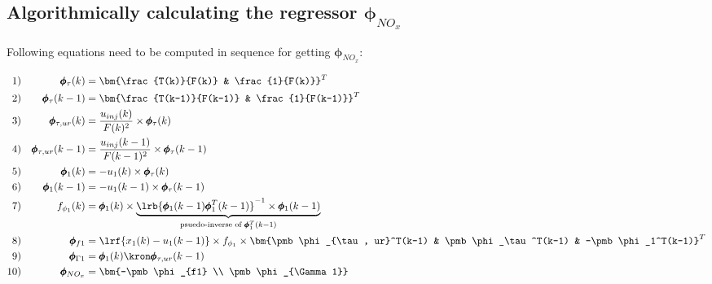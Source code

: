 \subsection{Algorithmically calculating the regressor $\pmb \phi_{NO_x}$}

Following equations need to be computed in sequence for getting $\pmb \phi_{NO_x}$:


\begin{align*}
        1)&& \pmb \phi_\tau(k) &= \bm{\frac{T(k)}{F(k)} & \frac{1}{F(k)}}^T \\
        2)&& \pmb \phi_\tau(k-1)&= \bm{\frac{T(k-1)}{F(k-1)} & \frac{1}{F(k-1)}}^T \\
        3)&& \pmb \phi_{\tau, ur}(k)&= \frac{u_{inj}(k)}{F(k)^2} \times \pmb \phi_\tau(k) \\
        4)&& \pmb \phi_{\tau, ur}(k-1)&= \frac{u_{inj}(k-1)}{F(k-1)^2} \times \pmb \phi_\tau(k-1) \\
        5)&& \pmb \phi_1(k) &= -u_1(k) \times \pmb \phi_\tau(k)\\
        6)&& \pmb \phi_1(k-1) &= -u_1(k-1) \times \pmb \phi_\tau(k-1) \\
        7)&& f_{\phi_1}(k) &= \pmb \phi_1(k) \times \underbrace{\lrb{\pmb \phi_1(k-1) \pmb \phi_1^T(k-1)}^{-1} \times \pmb \phi_1(k-1)}_{\text{psuedo-inverse of } \pmb \phi_1^T(k-1)}\\
        8)&& \pmb \phi_{f1} &= \lrf{x_1(k) - u_1(k-1)} \times f_{\phi_1} \times
                                \bm{\pmb \phi_{\tau, ur}^T(k-1) & \pmb \phi_\tau^T(k-1) & -\pmb \phi_1^T(k-1)}^T\\
        9)&& \pmb \phi_{\Gamma 1} &= \pmb \phi_1 (k) \kron \pmb \phi_{\tau, ur} (k-1) \\
        10)&& \pmb \phi_{NO_x} &= \bm{-\pmb \phi_{f1} \\ \pmb \phi_{\Gamma 1}}
\end{align*}
